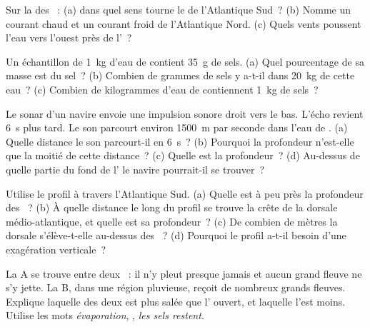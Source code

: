 \begin{exercise}[$\star$]\label{exo:g8:the-oceans:4}
Sur la  des ~: (a) dans quel sens tourne le  de
l'Atlantique Sud~? (b) Nomme un courant chaud et un courant froid de
l'Atlantique Nord. (c) Quels vents poussent l'eau vers l'ouest près de
l'~?
\end{exercise}

\begin{exercise}[$\star\star$]\label{exo:g8:the-oceans:5}
Un échantillon de \qty{1}{kg} d'eau de  contient \qty{35}{g} de sels.
(a) Quel pourcentage de sa masse est du sel~? (b) Combien de grammes de
sels y a-t-il dans \qty{20}{kg} de cette eau~? (c) Combien de kilogrammes
d'eau de  contiennent \qty{1}{kg} de sels~?
\end{exercise}

\begin{exercise}[$\star\star$]\label{exo:g8:the-oceans:6}
Le sonar d'un navire envoie une impulsion sonore droit vers le bas. L'écho
revient \qty{6}{s} plus tard. Le son parcourt environ \qty{1500}{m} par
seconde dans l'eau de . (a) Quelle distance le son parcourt-il en
\qty{6}{s}~? (b) Pourquoi la profondeur n'est-elle que la moitié de cette
distance~? (c) Quelle est la profondeur~? (d) Au-dessus de quelle partie
du fond de l' le navire pourrait-il se trouver~?
\end{exercise}

\begin{exercise}[$\star\star$]\label{exo:g8:the-oceans:7}
Utilise le profil à travers l'Atlantique Sud. (a) Quelle est à peu près
la profondeur des ~? (b) À quelle distance le long du
profil se trouve la crête de la dorsale médio-atlantique, et quelle est
sa profondeur~? (c) De combien de mètres la dorsale s'élève-t-elle
au-dessus des ~? (d) Pourquoi le profil a-t-il besoin d'une
exagération verticale~?
\end{exercise}

\begin{exercise}[$\star\star$]\label{exo:g8:the-oceans:8}
La  A se trouve entre deux ~: il n'y pleut presque jamais et
aucun grand fleuve ne s'y jette. La  B, dans une région pluvieuse,
reçoit de nombreux grands fleuves. Explique laquelle des deux est plus
salée que l' ouvert, et laquelle l'est moins. Utilise les mots
\emph{évaporation}, \emph{}, \emph{les sels restent}.
\end{exercise}

